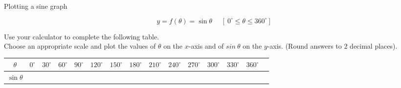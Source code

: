 \begin{wex}
{Plotting a sine graph}
{
\begin{equation*}
  y = f(\theta) = \sin\theta~~~~~~[~0^{\circ} \leq \theta \leq 360^{\circ}]
\end{equation*}


Use your calculator to complete the following table. \\
Choose an appropriate scale and plot the values of $\theta $ on the $x$-axis and of $sin~\theta $ on the $y$-axis. (Round answers to $2$ decimal places). 


\begin{table}[H]


\begin{tabular}{|c|m{0.3cm}|m{0.4cm}|m{0.4cm}|m{0.4cm}|m{0.5cm}|m{0.5cm}|m{0.5cm}|m{0.5cm}|m{0.5cm}|m{0.5cm}|m{0.5cm}|m{0.5cm}|m{0.5cm}|} \hline

\footnotesize$\theta $&
\footnotesize$0^{\circ }$&
\footnotesize$30^{\circ }$&
\footnotesize$60^{\circ }$&
\footnotesize$90^{\circ }$&
\footnotesize$120^{\circ }$&
\footnotesize$150^{\circ }$&
\footnotesize$180^{\circ }$&
\footnotesize$210^{\circ }$&
\footnotesize$240^{\circ }$&
\footnotesize$270^{\circ }$&
\footnotesize$300^{\circ }$&
\footnotesize$330^{\circ }$&
\footnotesize$360^{\circ }$
\\ \hline

\footnotesize$\sin\theta$&
&
&
&
&
&
&
&
&
&
&
&
&
&

 \hline
\end{tabular}

\end{table}
}
{
\begin{table}[H]

\begin{center}


\end{center}
\end{table}}
\end{wex}

